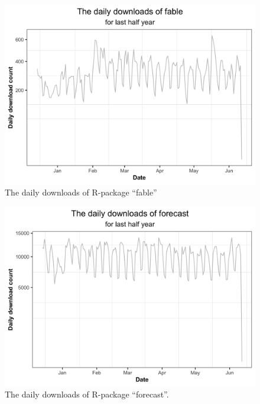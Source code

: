 \documentclass[
]{book}
\begin{document}
\begin{figure}

{\centering \includegraphics{figures/daily-fbl-1} 

}

\caption{The daily downloads of R-package ``fable''}\label{fig:daily-fbl}
\end{figure}



\begin{figure}

{\centering \includegraphics{figures/daily-fcst-1} 

}

\caption{The daily downloads of R-package ``forecast''.}\label{fig:daily-fcst}
\end{figure}
\end{document}
